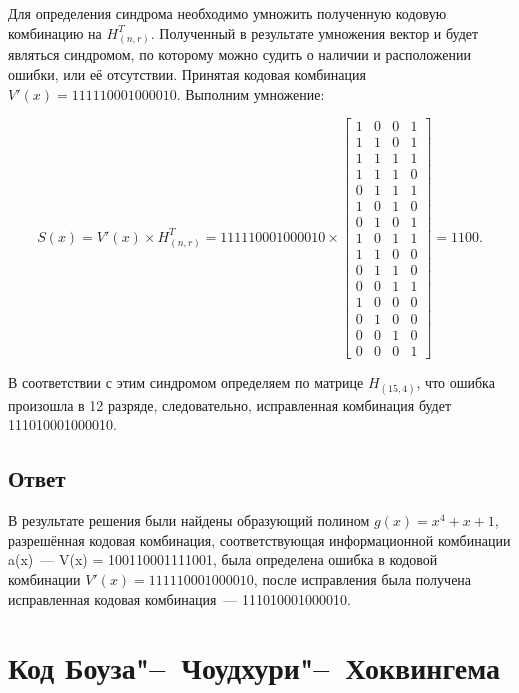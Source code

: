 Для определения синдрома необходимо умножить полученную кодовую
комбинацию на $H^T_{(n, r)}$. Полученный в результате умножения вектор
и будет являться синдромом, по которому можно судить о наличии и
расположении ошибки, или её отсутствии. Принятая кодовая комбинация
$V'(x) = 111110001000010$. Выполним умножение:

\begin{equation*}
  S(x) = V'(x) \times H^T_{(n, r)} = 111110001000010 \times
  \left[
    \begin{array}{cccc}
      1 & 0 & 0 & 1 \\
      1 & 1 & 0 & 1 \\
      1 & 1 & 1 & 1 \\
      1 & 1 & 1 & 0 \\
      0 & 1 & 1 & 1 \\
      1 & 0 & 1 & 0 \\
      0 & 1 & 0 & 1 \\
      1 & 0 & 1 & 1 \\
      1 & 1 & 0 & 0 \\
      0 & 1 & 1 & 0 \\
      0 & 0 & 1 & 1 \\
      1 & 0 & 0 & 0 \\
      0 & 1 & 0 & 0 \\
      0 & 0 & 1 & 0 \\
      0 & 0 & 0 & 1 
    \end{array}
  \right] = 1100.
\end{equation*}

В соответствии с этим синдромом определяем по матрице $H_{(15,4)}$,
что ошибка произошла в 12 разряде, следовательно, исправленная
комбинация будет 111010001000010.

\subsection{Ответ}

В результате решения были найдены образующий полином $g(x) = x^4 + x
+1$, разрешённая кодовая комбинация, соответствующая информационной
комбинации a(x)~--- V(x) = 100110001111001, была определена ошибка в
кодовой комбинации $V'(x) = 111110001000010$, после исправления была
получена исправленная кодовая комбинация~--- 111010001000010.
\newpage

\section{Код Боуза"--~Чоудхури"--~Хоквингема}
\label{sec:BCH}

